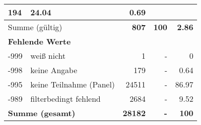 \begin{longtable}{lXrrr}
       \num{194} &
       \num[round-mode=places,round-precision=2]{24,04} &
         \num[round-mode=places,round-precision=2]{0,69} \\
     \midrule
     \multicolumn{2}{l}{Summe (gültig)} &
       \textbf{\num{807}} &
     \textbf{100} &
       \textbf{\num[round-mode=places,round-precision=2]{2,86}} \\
     \multicolumn{5}{l}{\textbf{Fehlende Werte}}\\
       -999 &
       weiß nicht &
         \num{1} &
        - &
         \num[round-mode=places,round-precision=2]{0} \\
       -998 &
       keine Angabe &
         \num{179} &
        - &
         \num[round-mode=places,round-precision=2]{0,64} \\
       -995 &
       keine Teilnahme (Panel) &
         \num{24511} &
        - &
         \num[round-mode=places,round-precision=2]{86,97} \\
       -989 &
       filterbedingt fehlend &
         \num{2684} &
        - &
         \num[round-mode=places,round-precision=2]{9,52} \\
     \midrule
     \multicolumn{2}{l}{\textbf{Summe (gesamt)}} &
          \textbf{\num{28182}} &
        \textbf{-} &
        \textbf{100} \\
     \bottomrule
     \end{longtable}
     

